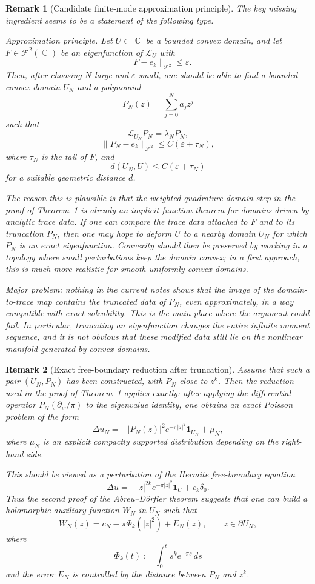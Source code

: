 \documentclass[a4paper,11pt,reqno]{amsart}
\newtheorem{remark}{Remark}[section]
\DeclareMathOperator{\C}{\mathbb{C}}
\begin{document}
\begin{remark}[Candidate finite-mode approximation principle]
The key missing ingredient seems to be a statement of the following type.

\smallskip
\emph{Approximation principle.}
Let \(U\subset\C\) be a bounded convex domain, and let \(F\in\mathcal F^2(\C)\)
be an eigenfunction of \(\mathcal L_U\) with
\[
\|F-e_k\|_{\mathcal F^2}\leq \varepsilon.
\]
Then, after choosing \(N\) large and \(\varepsilon\) small, one should be able
to find a bounded convex domain \(U_N\) and a polynomial
\[
P_N(z)=\sum_{j=0}^N a_j z^j
\]
such that
\[
\mathcal L_{U_N}P_N=\lambda_N P_N,
\]
\[
\|P_N-e_k\|_{\mathcal F^2}\leq C(\varepsilon+\tau_N),
\]
where \(\tau_N\) is the tail of \(F\), and
\[
d(U_N,U)\leq C(\varepsilon+\tau_N)
\]
for a suitable geometric distance \(d\).

\smallskip
The reason this is plausible is that the weighted quadrature-domain step in the
proof of Theorem~1 is already an implicit-function theorem for domains driven by
analytic trace data. If one can compare the trace data attached to \(F\) and to
its truncation \(P_N\), then one may hope to deform \(U\) to a nearby domain
\(U_N\) for which \(P_N\) is an exact eigenfunction. Convexity should then be
preserved by working in a topology where small perturbations keep the domain
convex; in a first approach, this is much more realistic for smooth uniformly
convex domains.

Major problem: nothing in the current notes shows that the image of the
domain-to-trace map contains the truncated data of \(P_N\), even approximately,
in a way compatible with exact solvability. This is the main place where the
argument could fail. In particular, truncating an eigenfunction changes the
entire infinite moment sequence, and it is not obvious that these modified data
still lie on the nonlinear manifold generated by convex domains.
\end{remark}

\begin{remark}[Exact free-boundary reduction after truncation]
Assume that such a pair \((U_N,P_N)\) has been constructed, with \(P_N\) close
to \(z^k\). Then the reduction used in the proof of Theorem~1 applies exactly:
after applying the differential operator \(P_N(\partial_w/\pi)\) to the
eigenvalue identity, one obtains an exact Poisson problem of the form
\[
\Delta u_N
=
-|P_N(z)|^2e^{-\pi|z|^2}\mathbf 1_{U_N}
+\mu_N,
\]
where \(\mu_N\) is an explicit compactly supported distribution depending on the
right-hand side.

This should be viewed as a perturbation of the Hermite free-boundary equation
\[
\Delta u
=
-|z|^{2k}e^{-\pi|z|^2}\mathbf 1_U+c_k\delta_0.
\]
Thus the second proof of the Abreu--D\"orfler theorem suggests that one can
build a holomorphic auxiliary function \(W_N\) in \(U_N\) such that
\[
W_N(z)=c_N-\pi\Phi_k(|z|^2)+E_N(z),
\qquad z\in\partial U_N,
\]
where
\[
\Phi_k(t):=\int_0^t s^k e^{-\pi s}\,ds
\]
and the error \(E_N\) is controlled by the distance between \(P_N\) and
\(z^k\).
\end{remark}
\end{document}
